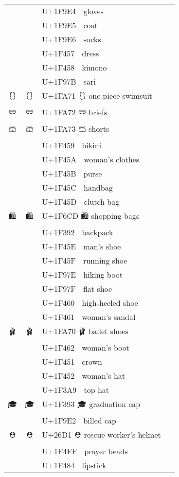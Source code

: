 \documentclass[a4paper,12pt]{article}
\newcommand{\fontA}[1]{{\fontspec[RawFeature={mode=harf,+dist,+ccmp}]{Segoe UI Emoji} #1}}
\newcommand{\fontB}[1]{{\fontspec[RawFeature={mode=harf,+dist,+ccmp}]{Noto Color Emoji} #1}}
\begin{document}
\begin{longtable}[c]{ccp{0.8\linewidth}}
\fontA{🧤}&\fontB{🧤}&U+1F9E4 🧤 gloves\\
\fontA{🧥}&\fontB{🧥}&U+1F9E5 🧥 coat\\
\fontA{🧦}&\fontB{🧦}&U+1F9E6 🧦 socks\\
\fontA{👗}&\fontB{👗}&U+1F457 👗 dress\\
\fontA{👘}&\fontB{👘}&U+1F458 👘 kimono\\
\fontA{🥻}&\fontB{🥻}&U+1F97B 🥻 sari\\
\fontA{🩱}&\fontB{🩱}&U+1FA71 🩱 one-piece swimsuit\\
\fontA{🩲}&\fontB{🩲}&U+1FA72 🩲 briefs\\
\fontA{🩳}&\fontB{🩳}&U+1FA73 🩳 shorts\\
\fontA{👙}&\fontB{👙}&U+1F459 👙 bikini\\
\fontA{👚}&\fontB{👚}&U+1F45A 👚 woman’s clothes\\
\fontA{👛}&\fontB{👛}&U+1F45B 👛 purse\\
\fontA{👜}&\fontB{👜}&U+1F45C 👜 handbag\\
\fontA{👝}&\fontB{👝}&U+1F45D 👝 clutch bag\\
\fontA{🛍}&\fontB{🛍}&U+1F6CD 🛍 shopping bags\\
\fontA{🎒}&\fontB{🎒}&U+1F392 🎒 backpack\\
\fontA{👞}&\fontB{👞}&U+1F45E 👞 man’s shoe\\
\fontA{👟}&\fontB{👟}&U+1F45F 👟 running shoe\\
\fontA{🥾}&\fontB{🥾}&U+1F97E 🥾 hiking boot\\
\fontA{🥿}&\fontB{🥿}&U+1F97F 🥿 flat shoe\\
\fontA{👠}&\fontB{👠}&U+1F460 👠 high-heeled shoe\\
\fontA{👡}&\fontB{👡}&U+1F461 👡 woman’s sandal\\
\fontA{🩰}&\fontB{🩰}&U+1FA70 🩰 ballet shoes\\
\fontA{👢}&\fontB{👢}&U+1F462 👢 woman’s boot\\
\fontA{👑}&\fontB{👑}&U+1F451 👑 crown\\
\fontA{👒}&\fontB{👒}&U+1F452 👒 woman’s hat\\
\fontA{🎩}&\fontB{🎩}&U+1F3A9 🎩 top hat\\
\fontA{🎓}&\fontB{🎓}&U+1F393 🎓 graduation cap\\
\fontA{🧢}&\fontB{🧢}&U+1F9E2 🧢 billed cap\\
\fontA{⛑}&\fontB{⛑}&U+26D1 ⛑ rescue worker’s helmet\\
\fontA{📿}&\fontB{📿}&U+1F4FF 📿 prayer beads\\
\fontA{💄}&\fontB{💄}&U+1F484 💄 lipstick\\

\end{longtable}
\end{document}
